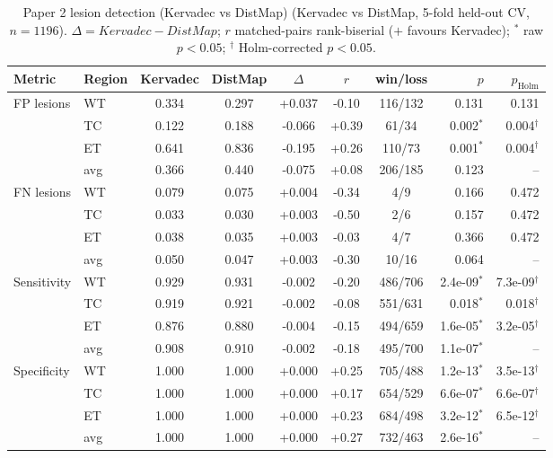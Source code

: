 \begin{table}[t]
\centering
\caption{Paper 2 lesion detection (Kervadec vs DistMap) (Kervadec vs DistMap, 5-fold held-out CV, $n=1196$). $\Delta=Kervadec-DistMap$; $r$ matched-pairs rank-biserial ($+$ favours Kervadec); $^{*}$ raw $p<0.05$; $^{\dagger}$ Holm-corrected $p<0.05$.}
\label{tab:p2_distmap_det}
\begin{tabular}{llcccccrr}
\toprule
Metric & Region & Kervadec & DistMap & $\Delta$ & $r$ & win/loss & $p$ & $p_{\mathrm{Holm}}$ \\
\midrule
\multirow{4}{*}{FP lesions} & WT & 0.334 & 0.297 & +0.037 & -0.10 & 116/132 & 0.131 & 0.131 \\
 & TC & 0.122 & 0.188 & -0.066 & +0.39 & 61/34 & 0.002$^{*}$ & 0.004$^{\dagger}$ \\
 & ET & 0.641 & 0.836 & -0.195 & +0.26 & 110/73 & 0.001$^{*}$ & 0.004$^{\dagger}$ \\
 & avg & 0.366 & 0.440 & -0.075 & +0.08 & 206/185 & 0.123 & -- \\
\midrule
\multirow{4}{*}{FN lesions} & WT & 0.079 & 0.075 & +0.004 & -0.34 & 4/9 & 0.166 & 0.472 \\
 & TC & 0.033 & 0.030 & +0.003 & -0.50 & 2/6 & 0.157 & 0.472 \\
 & ET & 0.038 & 0.035 & +0.003 & -0.03 & 4/7 & 0.366 & 0.472 \\
 & avg & 0.050 & 0.047 & +0.003 & -0.30 & 10/16 & 0.064 & -- \\
\midrule
\multirow{4}{*}{Sensitivity} & WT & 0.929 & 0.931 & -0.002 & -0.20 & 486/706 & 2.4e-09$^{*}$ & 7.3e-09$^{\dagger}$ \\
 & TC & 0.919 & 0.921 & -0.002 & -0.08 & 551/631 & 0.018$^{*}$ & 0.018$^{\dagger}$ \\
 & ET & 0.876 & 0.880 & -0.004 & -0.15 & 494/659 & 1.6e-05$^{*}$ & 3.2e-05$^{\dagger}$ \\
 & avg & 0.908 & 0.910 & -0.002 & -0.18 & 495/700 & 1.1e-07$^{*}$ & -- \\
\midrule
\multirow{4}{*}{Specificity} & WT & 1.000 & 1.000 & +0.000 & +0.25 & 705/488 & 1.2e-13$^{*}$ & 3.5e-13$^{\dagger}$ \\
 & TC & 1.000 & 1.000 & +0.000 & +0.17 & 654/529 & 6.6e-07$^{*}$ & 6.6e-07$^{\dagger}$ \\
 & ET & 1.000 & 1.000 & +0.000 & +0.23 & 684/498 & 3.2e-12$^{*}$ & 6.5e-12$^{\dagger}$ \\
 & avg & 1.000 & 1.000 & +0.000 & +0.27 & 732/463 & 2.6e-16$^{*}$ & -- \\
\midrule
\bottomrule
\end{tabular}
\end{table}

